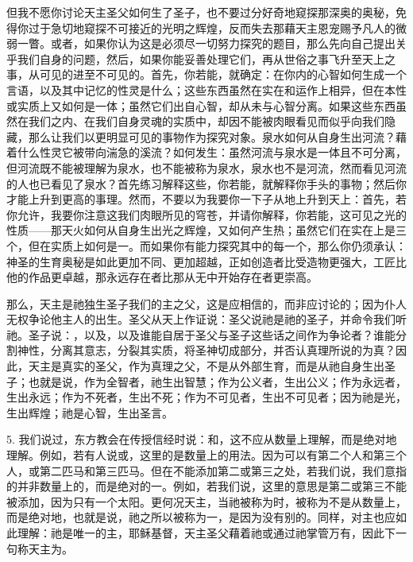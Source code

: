 但我不愿你讨论天主圣父如何生了圣子，也不要过分好奇地窥探那深奥的奥秘，免得你过于急切地窥探不可接近的光明之辉煌，反而失去那藉天主恩宠赐予凡人的微弱一瞥。或者，如果你认为这是必须尽一切努力探究的题目，那么先向自己提出关乎我们自身的问题，然后，如果你能妥善处理它们，再从世俗之事飞升至天上之事，从可见的进至不可见的。首先，你若能，就确定：在你内的心智如何生成一个言语，以及其中记忆的性灵是什么；这些东西虽然在实在和运作上相异，但在本性或实质上又如何是一体；虽然它们出自心智，却从未与心智分离。如果这些东西虽然在我们之内、在我们自身灵魂的实质中，却因不能被肉眼看见而似乎向我们隐藏，那么让我们以更明显可见的事物作为探究对象。泉水如何从自身生出河流？藉着什么性灵它被带向湍急的溪流？如何发生：虽然河流与泉水是一体且不可分离，但河流既不能被理解为泉水，也不能被称为泉水，泉水也不是河流，然而看见河流的人也已看见了泉水？首先练习解释这些，你若能，就解释你手头的事物；然后你才能上升到更高的事理。然而，不要以为我要你一下子从地上升到天上：首先，若你允许，我要你注意这我们肉眼所见的穹苍，并请你解释，你若能，这可见之光的性质——那天火如何从自身生出光之辉煌，又如何产生热；虽然它们在实在上是三个，但在实质上如何是一。而如果你有能力探究其中的每一个，那么你仍须承认：神圣的生育奥秘是如此更加不同、更加超越，正如创造者比受造物更强大，工匠比他的作品更卓越，那永远存在者比那从无中开始存在者更崇高。\par

那么，天主是祂独生圣子我们的主之父，这是应相信的，而非应讨论的；因为仆人无权争论他主人的出生。圣父从天上作证说：圣父说祂是祂的圣子，并命令我们听祂。圣子说：，以及，以及谁能自居于圣父与圣子这些话之间作为争论者？谁能分割神性，分离其意志，分裂其实质，将圣神切成部分，并否认真理所说的为真？因此，天主是真实的圣父，作为真理之父，不是从外部生育，而是从祂自身生出圣子；也就是说，作为全智者，祂生出智慧；作为公义者，生出公义；作为永远者，生出永远；作为不死者，生出不死；作为不可见者，生出不可见者；因为祂是光，生出辉煌；祂是心智，生出圣言。\par

5. 我们说过，东方教会在传授信经时说：和，这不应从数量上理解，而是绝对地理解。例如，若有人说或，这里的是数量上的用法。因为可以有第二个人和第三个人，或第二匹马和第三匹马。但在不能添加第二或第三之处，若我们说，我们意指的并非数量上的，而是绝对的一。例如，若我们说，这里的意思是第二或第三不能被添加，因为只有一个太阳。更何况天主，当祂被称为时，被称为不是从数量上，而是绝对地，也就是说，祂之所以被称为一，是因为没有别的。同样，对主也应如此理解：祂是唯一的主，耶稣基督，天主圣父藉着祂或通过祂掌管万有，因此下一句称天主为。\par

